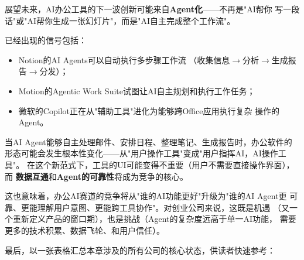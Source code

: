 \begin{whybox}
展望未来，AI办公工具的下一波创新可能来自\textbf{Agent化}——不再是"AI帮你
写一段话"或"AI帮你生成一张幻灯片"，而是"AI自主完成整个工作流"。

已经出现的信号包括：
\begin{itemize}
  \item Notion的AI Agents可以自动执行多步骤工作流
    （收集信息$\to$分析$\to$生成报告$\to$分发）；
  \item Motion的Agentic Work Suite试图让AI自主规划和执行工作任务；
  \item 微软的Copilot正在从"辅助工具"进化为能够跨Office应用执行复杂
    操作的Agent。
\end{itemize}

当AI Agent能够自主处理邮件、安排日程、整理笔记、生成报告时，办公软件的
形态可能会发生根本性变化——从"用户操作工具"变成"用户指挥AI，AI操作工具"。
在这个新范式下，工具的UI可能变得不重要（用户不需要直接操作界面），而
\textbf{数据互通}和\textbf{Agent的可靠性}将成为竞争的核心。

这也意味着，办公AI赛道的竞争将从"谁的AI功能更好"升级为"谁的AI Agent更
可靠、更能理解用户意图、更能跨工具协作"。对创业公司来说，这既是机遇
（又一个重新定义产品的窗口期），也是挑战（Agent的复杂度远高于单一AI功能，
需要更多的技术积累、数据飞轮、和用户信任）。
\end{whybox}

最后，以一张表格汇总本章涉及的所有公司的核心状态，供读者快速参考：

